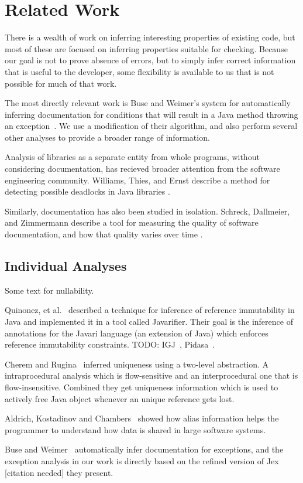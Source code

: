 \section{Related Work}
There is a wealth of work on inferring interesting properties of existing code,
but most of these are focused on inferring properties suitable for checking.
Because our goal is not to prove absence of errors, but to simply infer correct
information that is useful to the developer, some flexibility is available to us
that is not possible for much of that work.

The most directly relevant work is Buse and Weimer's system for automatically
inferring documentation for conditions that will result in a Java method
throwing an exception~\cite{autodoc}.  We use a modification of their
algorithm, and also perform several other analyses to provide a broader range
of information.

Analysis of libraries as a separate entity from whole programs, without
considering documentation, has recieved broader attention from the software
engineering community.  Williams, Thies, and Ernst describe a method for
detecting possible deadlocks in Java libraries \cite{deadlocklibs}.

Similarly, documentation has also been studied in isolation.  Schreck,
Dallmeier, and Zimmermann describe a tool for measuring the quality of software
documentation, and how that quality varies over time \cite{evolvedoc}.

\subsection{Individual Analyses}
Some text for nullability.

Quinonez, et al.~\cite{Javarifier} described a technique for inference of
reference immutability in Java and implemented it in a tool called {\sc
  Javarifier}. Their goal is the inference of annotations for the {\sc Javari}
language (an extension of Java) which enforces reference immutability
constraints. TODO: IGJ~\cite{IGJ}, Pidasa~\cite{Pidasa}.

Cherem and Rugina~\cite{UniquenessInference} inferred uniqueness using a two-level
abstraction. A intraprocedural analysis which is flow-sensitive and an interprocedural
one that is flow-insensitive. Combined they get uniqueness information
which is used to actively free Java object whenever an unique reference gets lost.

Aldrich, Kostadinov and Chambers~\cite{AliasJava} showed how alias information 
helps the programmer to understand how data is shared in large software systems.

Buse and Weimer~\cite{autodoc} automatically infer documentation for
exceptions, and the exception analysis in our work is directly based on the
refined version of {\sc Jex} [citation needed] they present.
